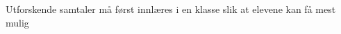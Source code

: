 \documentclass[main.tex]{subfiles}
\begin{document}
\newline
\newline
Utforskende samtaler må først innlæres i en klasse slik at elevene kan få mest mulig
\end{document}
